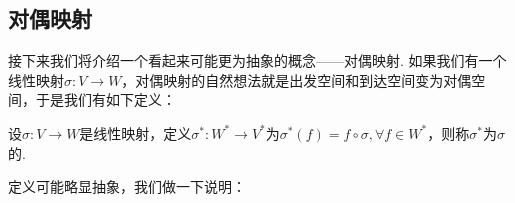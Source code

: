 \begin{solution}

\end{solution}

\subsection{对偶映射}

接下来我们将介绍一个看起来可能更为抽象的概念——对偶映射. 如果我们有一个线性映射$\sigma:V\to W$，对偶映射的自然想法就是出发空间和到达空间变为对偶空间，于是我们有如下定义：
\begin{definition}[对偶映射] 
    设$\sigma:V\to W$是线性映射，定义$\sigma^*:W^*\to V^*$为$\sigma^*(f)=f\circ\sigma,\forall f\in W^*$，则称$\sigma^*$为$\sigma$的.
\end{definition}
定义可能略显抽象，我们做一下说明：
